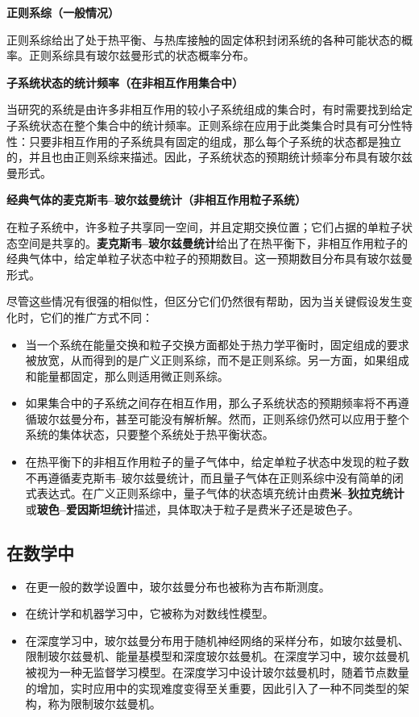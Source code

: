 \textbf{正则系综（一般情况）}  

正则系综给出了处于热平衡、与热库接触的固定体积封闭系统的各种可能状态的概率。正则系综具有玻尔兹曼形式的状态概率分布。  

\textbf{子系统状态的统计频率（在非相互作用集合中）}  

当研究的系统是由许多非相互作用的较小子系统组成的集合时，有时需要找到给定子系统状态在整个集合中的统计频率。正则系综在应用于此类集合时具有可分性特性：只要非相互作用的子系统具有固定的组成，那么每个子系统的状态都是独立的，并且也由正则系综来描述。因此，子系统状态的预期统计频率分布具有玻尔兹曼形式。  

\textbf{经典气体的麦克斯韦–玻尔兹曼统计（非相互作用粒子系统）}  

在粒子系统中，许多粒子共享同一空间，并且定期交换位置；它们占据的单粒子状态空间是共享的。\textbf{麦克斯韦–玻尔兹曼统计}给出了在热平衡下，非相互作用粒子的经典气体中，给定单粒子状态中粒子的预期数目。这一预期数目分布具有玻尔兹曼形式。

尽管这些情况有很强的相似性，但区分它们仍然很有帮助，因为当关键假设发生变化时，它们的推广方式不同：
\begin{itemize}
\item 当一个系统在能量交换和粒子交换方面都处于热力学平衡时，固定组成的要求被放宽，从而得到的是广义正则系综，而不是正则系综。另一方面，如果组成和能量都固定，那么则适用微正则系综。  
\item 如果集合中的子系统之间存在相互作用，那么子系统状态的预期频率将不再遵循玻尔兹曼分布，甚至可能没有解析解。然而，正则系综仍然可以应用于整个系统的集体状态，只要整个系统处于热平衡状态。  
\item 在热平衡下的非相互作用粒子的量子气体中，给定单粒子状态中发现的粒子数不再遵循麦克斯韦–玻尔兹曼统计，而且量子气体在正则系综中没有简单的闭式表达式。在广义正则系综中，量子气体的状态填充统计由费\textbf{米–狄拉克统计}或\textbf{玻色–爱因斯坦统计}描述，具体取决于粒子是费米子还是玻色子。 
\end{itemize} 
\subsection{在数学中}
\begin{itemize}
\item 在更一般的数学设置中，玻尔兹曼分布也被称为吉布斯测度。  
\item 在统计学和机器学习中，它被称为对数线性模型。  
\item 在深度学习中，玻尔兹曼分布用于随机神经网络的采样分布，如玻尔兹曼机、限制玻尔兹曼机、能量基模型和深度玻尔兹曼机。在深度学习中，玻尔兹曼机被视为一种无监督学习模型。在深度学习中设计玻尔兹曼机时，随着节点数量的增加，实时应用中的实现难度变得至关重要，因此引入了一种不同类型的架构，称为限制玻尔兹曼机。
\end{itemize}
